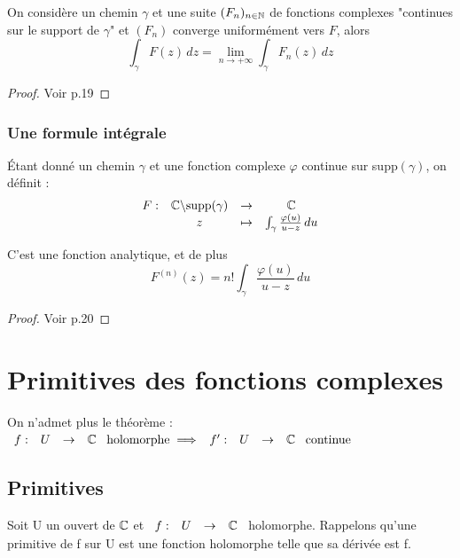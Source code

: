 \documentclass[]{report}
\begin{document}
\begin{lm}
    On considère un chemin $\gamma$ et une suite $(F_n)_{n\in\mathbb{N}}$ de fonctions complexes "continues sur le support de $\gamma$" et $(F_n)$ converge uniformément vers $F$, alors $$\int_\gamma F(z)\,dz=\lim_{n\to+\infty}\int_\gamma F_n(z)\,dz$$
\end{lm}

\begin{proof}
    Voir p.19
\end{proof}

\subsection{Une formule intégrale}

\begin{prop}
    Étant donné un chemin $\gamma$ et une fonction complexe $\varphi$ continue sur supp$(\gamma)$, on définit : $$\begin{array}{ccccc}
F : & \mathbb{C}\backslash\text{supp}(\gamma) & \to & \mathbb{C} \\
  & z & \mapsto & \int_\gamma \frac{\varphi(u)}{u-z} \,du
\end{array}$$
\begin{center}
    C'est une fonction analytique, et de plus\\
    $$F^{(n)}(z)=n!\int_\gamma\frac{\varphi(u)}{u-z}\,du$$
\end{center}
\end{prop}

\begin{proof}
    Voir p.20
\end{proof}

\chapter{Primitives des fonctions complexes}

On n'admet plus le théorème : $\begin{array}{ccccc}
f : & U & \to & \mathbb{C}
\end{array}\text{ holomorphe} \implies \begin{array}{ccccc}
f' : & U & \to & \mathbb{C}
\end{array} \text{ continue}$

\section{Primitives}

Soit U un ouvert de $\mathbb{C}$ et $\begin{array}{ccccc}
f : & U & \to & \mathbb{C}
\end{array}$ holomorphe. Rappelons qu'une primitive de f sur U est une fonction holomorphe telle que sa dérivée est f.
\end{document}
